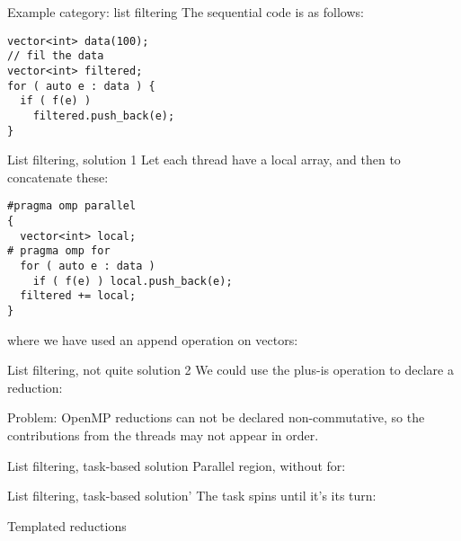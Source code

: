 \begin{numberedframe}{Example category: list filtering}
The sequential code is as follows:
\begin{lstlisting}
vector<int> data(100);
// fil the data
vector<int> filtered;
for ( auto e : data ) {
  if ( f(e) )
    filtered.push_back(e);
}
\end{lstlisting}
\end{numberedframe}

\begin{numberedframe}{List filtering, solution 1}
  Let each thread have a local array,
  and then to concatenate these:
\begin{lstlisting}
#pragma omp parallel
{
  vector<int> local;
# pragma omp for
  for ( auto e : data )
    if ( f(e) ) local.push_back(e);
  filtered += local;
}
\end{lstlisting}
where we have used an append operation on vectors:
\end{numberedframe}

\begin{numberedframe}{List filtering, not quite solution 2}
We could use the plus-is operation to declare a reduction:

Problem: OpenMP reductions can not be declared non-commutative,
so the contributions from the threads
may not appear in order.

\end{numberedframe}

\begin{numberedframe}{List filtering, task-based solution}
  Parallel region, without for:
\end{numberedframe}

\begin{numberedframe}{List filtering, task-based solution'}
  The task spins until it's its turn:
\end{numberedframe}

\begin{numberedframe}{Templated reductions}
  
\end{numberedframe}

